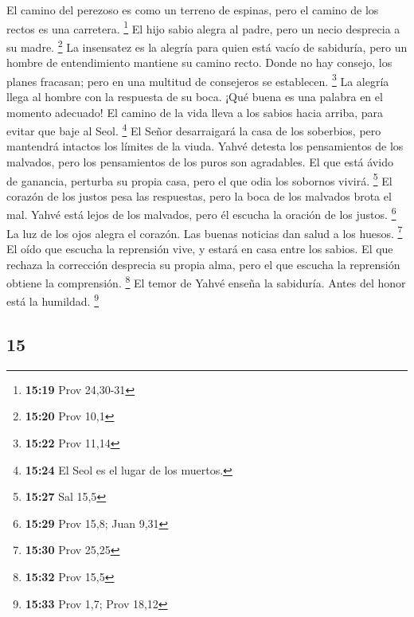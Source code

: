 \begin{paracol}{2}
 El camino del perezoso es como un terreno de espinas,
pero el camino de los rectos es una carretera. \footnote{\textbf{15:19}
  Prov 24,30-31}  El hijo sabio alegra al padre, pero un
necio desprecia a su madre. \footnote{\textbf{15:20} Prov 10,1}
 La insensatez es la alegría para quien está vacío de
sabiduría, pero un hombre de entendimiento mantiene su camino recto.
 Donde no hay consejo, los planes fracasan; pero en una
multitud de consejeros se establecen. \footnote{\textbf{15:22} Prov
  11,14}  La alegría llega al hombre con la respuesta de
su boca. ¡Qué buena es una palabra en el momento adecuado!
 El camino de la vida lleva a los sabios hacia arriba,
para evitar que baje al Seol. \footnote{\textbf{15:24} El Seol es el
  lugar de los muertos.}  El Señor desarraigará la casa
de los soberbios, pero mantendrá intactos los límites de la viuda.
 Yahvé detesta los pensamientos de los malvados, pero los
pensamientos de los puros son agradables.  El que está
ávido de ganancia, perturba su propia casa, pero el que odia los
sobornos vivirá. \footnote{\textbf{15:27} Sal 15,5}  El
corazón de los justos pesa las respuestas, pero la boca de los malvados
brota el mal.  Yahvé está lejos de los malvados, pero él
escucha la oración de los justos. \footnote{\textbf{15:29} Prov 15,8;
  Juan 9,31}  La luz de los ojos alegra el corazón. Las
buenas noticias dan salud a los huesos. \footnote{\textbf{15:30} Prov
  25,25}  El oído que escucha la reprensión vive, y
estará en casa entre los sabios.  El que rechaza la
corrección desprecia su propia alma, pero el que escucha la reprensión
obtiene la comprensión. \footnote{\textbf{15:32} Prov 15,5}
 El temor de Yahvé enseña la sabiduría. Antes del honor
está la humildad. \footnote{\textbf{15:33} Prov 1,7; Prov 18,12}

\switchcolumn
\begin{otherlanguage}{english}

\hypertarget{section-29}{%
\section{15}\label{section-29}}


\end{otherlanguage}
\end{paracol}

